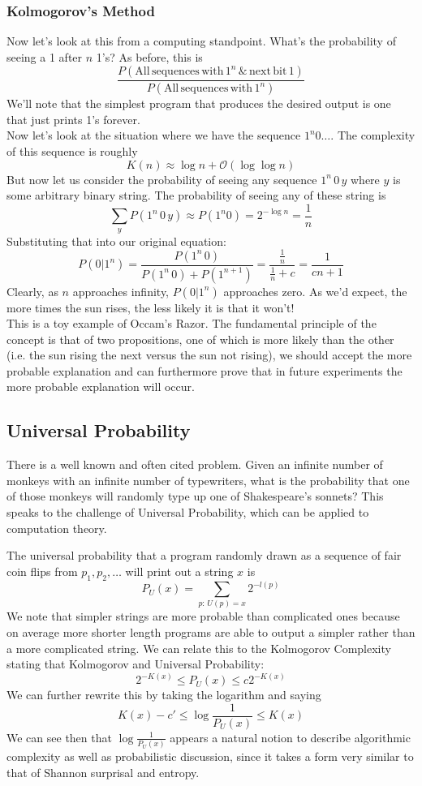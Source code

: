 \documentclass[11pt]{article}
\theoremstyle{definition}
\begin{document}
\subsubsection{Kolmogorov's Method}
Now let's look at this from a computing standpoint. What's the probability of seeing a 1 after $n$ 1's? As before, this is 
$$\frac{P(\mathrm{All \, sequences \, with \, } 1^n \, \& \, \mathrm{next \, bit \, 1})}{P(\mathrm{All \, sequences \, with \, } 1^n)}$$
We'll note that the simplest program that produces the desired output is one that just prints 1's forever.\\
Now let's look at the situation where we have the sequence $1^n 0\dots$.
The complexity of this sequence is roughly
$$K(n) \approx \log{n} + \mathcal{O}(\log \log n)$$
But now let us consider the probability of seeing any sequence $1^n \, 0 \, y$ where $y$ is some arbitrary binary string. The probability of seeing any of these string is 
$$\sum_y P(1^n \, 0 \, y) \approx P(1^n 0) = 2^{-\log n}  = \frac{1}{n}$$
Substituting that into our original equation:
$$P(0 | 1^n) = \frac{P(1^n \, 0)}{P(1^n \, 0) + P(1^{n + 1})} = \frac{\frac 1n}{\frac 1n + c} = \frac{1}{cn + 1}$$
Clearly, as $n$ approaches infinity, $P(0 | 1^n)$ approaches zero. As we'd expect, the more times the sun rises, the less likely it is that it won't!\\
This is a toy example of Occam's Razor. The fundamental principle of the concept is that of two propositions, one of which is more likely than the other (i.e. the sun rising the next versus the sun not rising), we should accept the more probable explanation and can furthermore prove that in future experiments the more probable explanation will occur. 
\subsection{Universal Probability}
There is a well known and often cited problem. Given an infinite number of monkeys with an infinite number of typewriters, what is the probability that one of those monkeys will randomly type up one of Shakespeare's sonnets? This speaks to the challenge of Universal Probability, which can be applied to computation theory. 

 The universal probability that a program randomly drawn as a sequence of fair coin flips from $p_1, p_2, \dots$ will print out a string $x$ is
$$P_U (x) = \sum_{p: \, U(p) = x} 2^{-l(p)}$$
We note that simpler strings are more probable than complicated ones because on average more shorter length programs are able to output a simpler rather than a more complicated string. We can relate this to the Kolmogorov Complexity stating that 
\theorem Kolmogorov and Universal Probability: 
$$2^{-K(x)} \leq P_U (x) \leq c 2^{-K(x)}$$
We can further rewrite this by taking the logarithm and saying 
$$K(x) - c' \leq \log {\frac{1}{P_U (x)}} \leq K(x)$$
We can see then that $\log {\frac{1}{P_U (x)}}$ appears a natural notion to describe algorithmic complexity as well as probabilistic discussion, since it takes a form very similar to that of Shannon surprisal and entropy.
\end{document}
